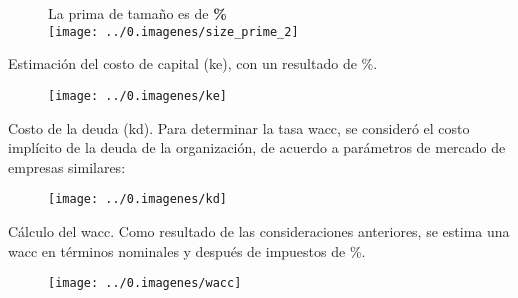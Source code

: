 \begin{figure}[H]
\centering
La prima de tamaño es de \textbf{\textcolor{principal}{\sizePrime\%}} \\
\texttt{[image: ../0.imagenes/size\_prime\_2]}
\end{figure}


Estimaci\'on del costo de capital (\gls{ke}), con un resultado de \textcolor{principal}{\keValor\%.}

\begin{figure}[H]
\centering
\texttt{[image: ../0.imagenes/ke]}
\end{figure}


\textcolor{principal}{Costo de la deuda (\gls{kd}).} Para determinar la tasa \gls{wacc}, se consider\'o el costo impl\'icito de la deuda de la organizaci\'on, de acuerdo a par\'ametros de mercado de empresas similares:

\begin{figure}[H]
\centering
\texttt{[image: ../0.imagenes/kd]}
\end{figure}

\textcolor{principal}{C\'alculo del \gls{wacc}.} Como resultado de las consideraciones anteriores, se estima una \gls{wacc} en t\'erminos nominales y despu\'es de impuestos de \textcolor{principal}{\waccValor\%}.\\

\begin{figure}[H]
\centering
\texttt{[image: ../0.imagenes/wacc]}
\end{figure}

